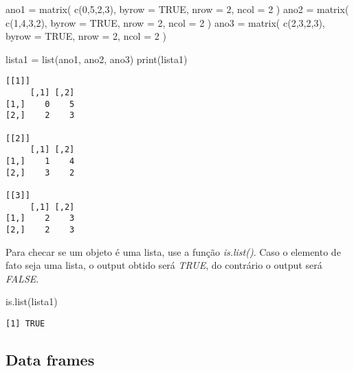 \documentclass[
  letterpaper,
  DIV=11,
  numbers=noendperiod]{scrreprt}
\newenvironment{Shaded}{\begin{snugshade}}{\end{snugshade}}
\newcommand{\AttributeTok}[1]{\textcolor[rgb]{0.40,0.45,0.13}{#1}}
\newcommand{\ConstantTok}[1]{\textcolor[rgb]{0.56,0.35,0.01}{#1}}
\newcommand{\DecValTok}[1]{\textcolor[rgb]{0.68,0.00,0.00}{#1}}
\newcommand{\FunctionTok}[1]{\textcolor[rgb]{0.28,0.35,0.67}{#1}}
\newcommand{\NormalTok}[1]{\textcolor[rgb]{0.00,0.23,0.31}{#1}}
\newcommand{\OtherTok}[1]{\textcolor[rgb]{0.00,0.23,0.31}{#1}}
\begin{document}
\begin{Shaded}
\begin{Highlighting}[]
\NormalTok{ano1 }\OtherTok{=} \FunctionTok{matrix}\NormalTok{(}
  \FunctionTok{c}\NormalTok{(}\DecValTok{0}\NormalTok{,}\DecValTok{5}\NormalTok{,}\DecValTok{2}\NormalTok{,}\DecValTok{3}\NormalTok{), }\AttributeTok{byrow =} \ConstantTok{TRUE}\NormalTok{, }\AttributeTok{nrow =} \DecValTok{2}\NormalTok{, }\AttributeTok{ncol =} \DecValTok{2}
\NormalTok{)}
\NormalTok{ano2 }\OtherTok{=} \FunctionTok{matrix}\NormalTok{(}
  \FunctionTok{c}\NormalTok{(}\DecValTok{1}\NormalTok{,}\DecValTok{4}\NormalTok{,}\DecValTok{3}\NormalTok{,}\DecValTok{2}\NormalTok{), }\AttributeTok{byrow =} \ConstantTok{TRUE}\NormalTok{, }\AttributeTok{nrow =} \DecValTok{2}\NormalTok{, }\AttributeTok{ncol =} \DecValTok{2}
\NormalTok{)}
\NormalTok{ano3 }\OtherTok{=} \FunctionTok{matrix}\NormalTok{(}
  \FunctionTok{c}\NormalTok{(}\DecValTok{2}\NormalTok{,}\DecValTok{3}\NormalTok{,}\DecValTok{2}\NormalTok{,}\DecValTok{3}\NormalTok{), }\AttributeTok{byrow =} \ConstantTok{TRUE}\NormalTok{, }\AttributeTok{nrow =} \DecValTok{2}\NormalTok{, }\AttributeTok{ncol =} \DecValTok{2}
\NormalTok{)}

\NormalTok{lista1 }\OtherTok{=} \FunctionTok{list}\NormalTok{(ano1, ano2, ano3)}
\FunctionTok{print}\NormalTok{(lista1)}
\end{Highlighting}
\end{Shaded}

\begin{verbatim}
[[1]]
     [,1] [,2]
[1,]    0    5
[2,]    2    3

[[2]]
     [,1] [,2]
[1,]    1    4
[2,]    3    2

[[3]]
     [,1] [,2]
[1,]    2    3
[2,]    2    3
\end{verbatim}

Para checar se um objeto é uma lista, use a função \emph{is.list()}.
Caso o elemento de fato seja uma lista, o output obtido será
\emph{TRUE}, do contrário o output será \emph{FALSE}.

\begin{Shaded}
\begin{Highlighting}[]
\FunctionTok{is.list}\NormalTok{(lista1)}
\end{Highlighting}
\end{Shaded}

\begin{verbatim}
[1] TRUE
\end{verbatim}

\subsection{Data frames}\label{data-frames}
\end{document}
